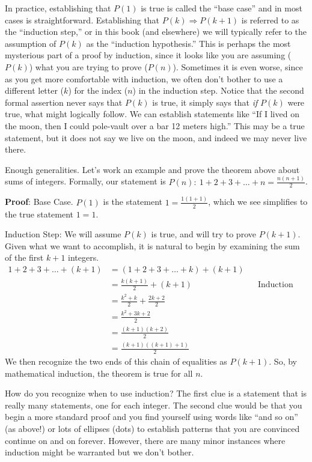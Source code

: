 %
In practice, establishing that $P(1)$ is true is called the ``base case'' and in most cases is straightforward.  Establishing that $P(k)\Rightarrow P(k+1)$ is referred to as the ``induction step,'' or in this book (and elsewhere) we will typically refer to the assumption of $P(k)$ as the ``induction hypothesis.''  This is perhaps the most mysterious part of a proof by induction, since it looks like you are assuming ($P(k)$) what you are trying to prove ($P(n)$).  Sometimes it is even worse, since as you get more comfortable with induction, we often don't bother to use a different letter ($k$) for the index ($n$) in the induction step.  Notice that the second formal assertion never says that $P(k)$ is true, it simply says that {\em if} $P(k)$ were true, what might logically follow.  We can establish statements like ``If I lived on the moon, then I could pole-vault over a bar 12 meters high.''  This may be a true statement, but it does not say we live on the moon, and indeed we may never live there.\par
%
Enough generalities.  Let's work an example and prove the theorem above about sums of integers.  Formally, our statement is $P(n):\ 1+2+3+\dots+n=\displaystyle\frac{n(n+1)}{2}$.\par\medskip
%
{\bf Proof}:  Base Case.  $P(1)$ is the statement $1=\frac{1(1+1)}{2}$, which we see simplifies to the true statement $1=1$.\par
%
Induction Step:  We will assume $P(k)$ is true, and will try to prove $P(k+1)$.  Given what we want to accomplish, it is natural to begin by examining the sum of the first $k+1$ integers.
%
\begin{align*}
1+2+3+\dots+(k+1)
%
&=\left(1+2+3+\dots+k\right) + (k+1)\\
%
&=\frac{k(k+1)}{2} + (k+1)&&\text{Induction Hypothesis}\\
%
&=\frac{k^2+k}{2} + \frac{2k+2}{2}\\
%
&=\frac{k^2+3k+2}{2}\\
%
&=\frac{(k+1)(k+2)}{2}\\
%
&=\frac{(k+1)((k+1)+1)}{2}
%
\end{align*}
%
We then recognize the two ends of this chain of equalities as $P(k+1)$.  So, by mathematical induction, the theorem is true for all $n$.\par\medskip
%
How do you recognize when to use induction?  The first clue is a statement that is really many statements, one for each integer.  The second clue would be that you begin a more standard proof and you find yourself using words like ``and so on'' (as above!) or lots of ellipses (dots) to establish patterns that you are convinced continue on and on forever.  However, there are many minor instances where induction might be warranted but we don't bother.\par

